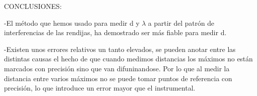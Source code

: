 \documentclass[12pt,thmsa]{article}
\begin{document}
\vspace{1pt}

CONCLUSIONES:

-El m\'{e}todo que hemos usado para medir d y $\lambda $ a partir del
patr\'{o}n de interferencias de las rendijas, ha demostrado ser m\'{a}s
fiable para medir d.

-Existen unos errores relativos un tanto elevados, se pueden anotar entre
las distintas causas el hecho de que cuando medimos distancias los
m\'{a}ximos no est\'{a}n marcados con precisi\'{o}n sino que van
difuninandose. Por lo que al medir la distancia entre varios m\'{a}ximos no
se puede tomar puntos de referencia con precisi\'{o}n, lo que introduce un
error mayor que el instrumental.
\end{document}
